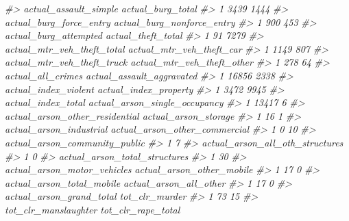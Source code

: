 \documentclass[
]{krantz}
\makeatletter
\newenvironment{Shaded}{\begin{snugshade}}{\end{snugshade}}
\newcommand{\CommentTok}[1]{\textcolor[rgb]{0.37,0.37,0.37}{\textit{#1}}}
\newenvironment{kframe}{%
\medskip{}
\setlength{\fboxsep}{.8em}
 \def\at@end@of@kframe{}%
 \ifinner\ifhmode%
  \def\at@end@of@kframe{\end{minipage}}%
  \begin{minipage}{\columnwidth}%
 \fi\fi%
 \def\FrameCommand##1{\hskip\@totalleftmargin \hskip-\fboxsep
 \colorbox{shadecolor}{##1}\hskip-\fboxsep
     \hskip-\linewidth \hskip-\@totalleftmargin \hskip\columnwidth}%
 \MakeFramed {\advance\hsize-\width
   \@totalleftmargin\z@ \linewidth\hsize
   \@setminipage}}%
 {\par\unskip\endMakeFramed%
 \at@end@of@kframe}
\renewenvironment{Shaded}{\begin{kframe}}{\end{kframe}}
\makeatother
\begin{document}
\begin{Shaded}
\begin{Highlighting}[]
\CommentTok{\#\textgreater{}   actual\_assault\_simple actual\_burg\_total}
\CommentTok{\#\textgreater{} 1                  3439              1444}
\CommentTok{\#\textgreater{}   actual\_burg\_force\_entry actual\_burg\_nonforce\_entry}
\CommentTok{\#\textgreater{} 1                     900                        453}
\CommentTok{\#\textgreater{}   actual\_burg\_attempted actual\_theft\_total}
\CommentTok{\#\textgreater{} 1                    91               7279}
\CommentTok{\#\textgreater{}   actual\_mtr\_veh\_theft\_total actual\_mtr\_veh\_theft\_car}
\CommentTok{\#\textgreater{} 1                       1149                      807}
\CommentTok{\#\textgreater{}   actual\_mtr\_veh\_theft\_truck actual\_mtr\_veh\_theft\_other}
\CommentTok{\#\textgreater{} 1                        278                         64}
\CommentTok{\#\textgreater{}   actual\_all\_crimes actual\_assault\_aggravated}
\CommentTok{\#\textgreater{} 1             16856                      2338}
\CommentTok{\#\textgreater{}   actual\_index\_violent actual\_index\_property}
\CommentTok{\#\textgreater{} 1                 3472                  9945}
\CommentTok{\#\textgreater{}   actual\_index\_total actual\_arson\_single\_occupancy}
\CommentTok{\#\textgreater{} 1              13417                             6}
\CommentTok{\#\textgreater{}   actual\_arson\_other\_residential actual\_arson\_storage}
\CommentTok{\#\textgreater{} 1                             16                    1}
\CommentTok{\#\textgreater{}   actual\_arson\_industrial actual\_arson\_other\_commercial}
\CommentTok{\#\textgreater{} 1                       0                            10}
\CommentTok{\#\textgreater{}   actual\_arson\_community\_public}
\CommentTok{\#\textgreater{} 1                             7}
\CommentTok{\#\textgreater{}   actual\_arson\_all\_oth\_structures}
\CommentTok{\#\textgreater{} 1                               0}
\CommentTok{\#\textgreater{}   actual\_arson\_total\_structures}
\CommentTok{\#\textgreater{} 1                            30}
\CommentTok{\#\textgreater{}   actual\_arson\_motor\_vehicles actual\_arson\_other\_mobile}
\CommentTok{\#\textgreater{} 1                          17                         0}
\CommentTok{\#\textgreater{}   actual\_arson\_total\_mobile actual\_arson\_all\_other}
\CommentTok{\#\textgreater{} 1                        17                      0}
\CommentTok{\#\textgreater{}   actual\_arson\_grand\_total tot\_clr\_murder}
\CommentTok{\#\textgreater{} 1                       73             15}
\CommentTok{\#\textgreater{}   tot\_clr\_manslaughter tot\_clr\_rape\_total}

\end{Highlighting}
\end{Shaded}
\end{document}
